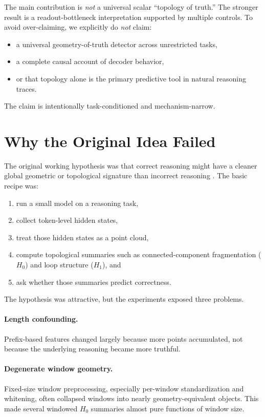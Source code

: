 \documentclass[11pt]{article}
\begin{document}
The main contribution is \emph{not} a universal scalar ``topology of truth.''
The stronger result is a readout-bottleneck interpretation supported by multiple controls.
To avoid over-claiming, we explicitly do \emph{not} claim:
\begin{itemize}
  \item a universal geometry-of-truth detector across unrestricted tasks,
  \item a complete causal account of decoder behavior,
  \item or that topology alone is the primary predictive tool in natural reasoning traces.
\end{itemize}
The claim is intentionally task-conditioned and mechanism-narrow.

\section{Why the Original Idea Failed}
The original working hypothesis was that correct reasoning might have a cleaner global geometric or topological signature than incorrect reasoning \cite{carlsson2009,bauer2021ripser}.
The basic recipe was:
\begin{enumerate}
  \item run a small model on a reasoning task,
  \item collect token-level hidden states,
  \item treat those hidden states as a point cloud,
  \item compute topological summaries such as connected-component fragmentation ($H_0$) and loop structure ($H_1$), and
  \item ask whether those summaries predict correctness.
\end{enumerate}

The hypothesis was attractive, but the experiments exposed three problems.

\paragraph{Length confounding.}
Prefix-based features changed largely because more points accumulated, not because the underlying reasoning became more truthful.

\paragraph{Degenerate window geometry.}
Fixed-size window preprocessing, especially per-window standardization and whitening, often collapsed windows into nearly geometry-equivalent objects.
This made several windowed $H_0$ summaries almost pure functions of window size.
\end{document}
